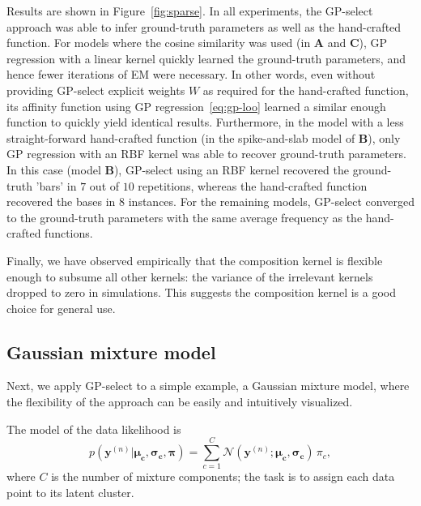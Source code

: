\documentclass[12pt]{article}
\renewcommand{\vec}[1]{{\mathbf{#1}}}
\begin{document}
Results are shown in Figure~\ref{fig:sparse}.
In all experiments, the GP-select approach was able to infer ground-truth parameters as well as the hand-crafted function.
For models where the cosine similarity was used (in \textbf{A} and \textbf{C}), GP regression with a linear kernel quickly learned the ground-truth parameters, and hence fewer iterations of EM were necessary.
In other words, even without providing GP-select explicit weights $W$ as required for the hand-crafted function, its affinity function using GP regression~\eqref{eq:gp-loo} learned a similar enough function to quickly yield identical results.
Furthermore, in the model with a less straight-forward hand-crafted function (in the spike-and-slab model of \textbf{B}), only GP regression with an RBF kernel was able to recover ground-truth parameters.
In this case (model \textbf{B}), GP-select using an RBF kernel recovered the ground-truth 'bars' in $7$ out of $10$ repetitions, whereas the hand-crafted function recovered the bases in $8$ instances.
For the remaining models, GP-select converged to the ground-truth parameters with the same average frequency as the hand-crafted functions.
 
Finally, we have observed empirically that the composition kernel is flexible enough to subsume all other kernels:
the variance of the irrelevant kernels dropped to zero in simulations.
This suggests the composition kernel is a good choice  for general use. 

\subsection{Gaussian mixture model}
Next, we apply GP-select to a simple example, a Gaussian mixture model, where the flexibility of the approach can be easily and intuitively visualized.  

The model of the data likelihood is
\vspace{-.2cm}
\begin{equation}\label{eq:mog}
p(\vec{y}^{(n)} | \vec{\mu_c}, \vec{\sigma_c}, \vec{\pi}) = \sum_{c=1}^{C} \mathcal{N}(\vec{y}^{(n)}; \vec{\mu_c}, \vec{\sigma_c}) \, \pi_c,
\end{equation}
where $C$ is the number of mixture components; the task is to assign each data point to its latent cluster.
\end{document}
